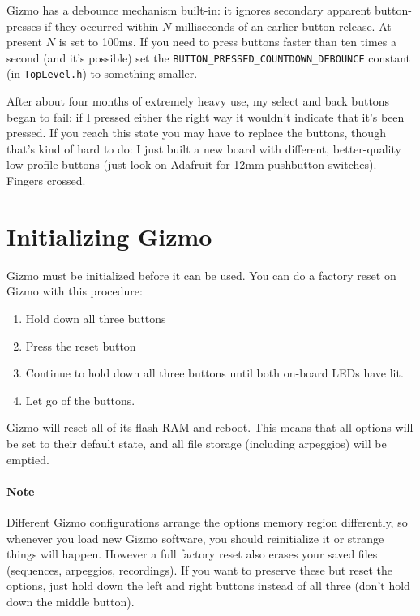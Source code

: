 \documentclass{article}
\begin{document}
Gizmo has a debounce mechanism built-in: it ignores secondary apparent button-presses if they occurred within \(N\) milliseconds of an earlier button release.  At present \(N\) is set to 100ms.  If you need to press buttons faster than ten times a second (and it's possible) set the \texttt{BUTTON\_PRESSED\_COUNTDOWN\_DEBOUNCE} constant (in \texttt{TopLevel.h}) to something smaller.

After about four months of extremely heavy use, my select and back buttons began to fail: if I pressed either the right way it wouldn't indicate that it's been pressed.  If you reach this state you may have to replace the buttons, though that's kind of hard to do: I just built a new board with different, better-quality low-profile buttons (just look on Adafruit for 12mm pushbutton switches).  Fingers crossed.

\clearpage
\section{Initializing Gizmo}

Gizmo must be initialized before it can be used.  You can do a factory reset on Gizmo with this procedure:

\begin{enumerate}
\item Hold down all three buttons
\item Press the reset button
\item Continue to hold down all three buttons until both on-board LEDs have lit.
\item Let go of the buttons.
\end{enumerate}

Gizmo will reset all of its flash RAM and reboot.  This means that all options will be set to their default state, and all file storage (including arpeggios) will be emptied.

\paragraph{Note} Different Gizmo configurations arrange the options memory region differently, so whenever you load new Gizmo software, you should reinitialize it or strange things will happen.  However a full factory reset also erases your saved files (sequences, arpeggios, recordings).  If you want to preserve these but reset the options, just hold down the left and right buttons instead of all three (don't hold down the middle button).
\end{document}
